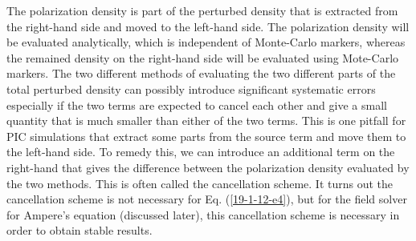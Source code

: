 \documentclass{article}
\begin{document}
The polarization density is part of the perturbed density that is extracted
from the right-hand side and moved to the left-hand side. The polarization
density will be evaluated analytically, which is independent of Monte-Carlo
markers, whereas the remained density on the right-hand side will be evaluated
using Mote-Carlo markers. The two different methods of evaluating the two
different parts of the total perturbed density can possibly introduce
significant systematic errors especially if the two terms are expected to
cancel each other and give a small quantity that is much smaller than either
of the two terms. This is one pitfall for PIC simulations that extract some
parts from the source term and move them to the left-hand side. To remedy
this, we can introduce an additional term on the right-hand that gives the
difference between the polarization density evaluated by the two methods. This
is often called the cancellation scheme. It turns out the cancellation scheme
is not necessary for Eq. (\ref{19-1-12-e4}), but for the field solver for
Ampere's equation (discussed later), this cancellation scheme is necessary in
order to obtain stable results.
\end{document}
